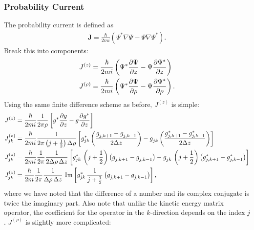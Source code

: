 \documentclass[12pt]{article}
\numberwithin{equation}{section}
\begin{document}
\subsubsection{Probability Current}\label{sec:cylindrical_probability_current}
The probability current is defined as
\begin{align*}
\mathbf{J} = \frac{\hbar}{2m i} \left(\Psi^* \nabla \Psi -\Psi \nabla \Psi^* \right).
\end{align*}
Break this into components:
\begin{align*}
J^{(z)}  &= \frac{\hbar}{2m i} \left(\Psi^* \pdv{\Psi}{z} - \Psi \pdv{\Psi^*}{z} \right) \\
J^{(\rho)}  &= \frac{\hbar}{2m i} \left(\Psi^* \pdv{\Psi}{\rho} - \Psi \pdv{\Psi^*}{\rho} \right).
\end{align*}
Using the same finite difference scheme as before, $J^{(z)}$ is simple:
\begin{align*}
J^{(z)} &= \frac{\hbar}{2m i} \frac{1}{2\pi \rho}\left[g^* \pdv{g}{z} - g \pdv{g^*}{z} \right] \\
%
J^{(z)}_{jk} &= \frac{\hbar}{2m i} \frac{1}{2\pi \left(j+\frac{1}{2}\right) \Delta \rho}\left[g^*_{jk} \left(\frac{g^{}_{j,k+1} - g^{}_{j, k-1}}{2 \Delta z}\right) - g^{}_{jk} \left(\frac{g^{*}_{j,k+1} - g^{*}_{j, k-1}}{2 \Delta z}\right) \right] \\
%
J^{(z)}_{jk} &= \frac{\hbar}{2m i} \frac{1}{2\pi} \frac{1}{2\Delta \rho \, \Delta z}\left[g^*_{jk} \, \left(j+\frac{1}{2}\right) \left(g^{}_{j,k+1} - g^{}_{j, k-1}\right) - g^{}_{jk} \, \left(j+\frac{1}{2}\right)\left(g^{*}_{j,k+1} - g^{*}_{j, k-1}\right) \right] \\
%
J^{(z)}_{jk} &= \frac{\hbar}{2m} \frac{1}{2\pi} \frac{1}{\Delta \rho \, \Delta z} \, \operatorname{Im}\left[g^*_{jk} \, \frac{1}{j + \frac{1}{2}} \left(g^{}_{j,k+1} - g^{}_{j, k-1}\right)\right],
\end{align*}
where we have noted that the difference of a number and its complex conjugate is twice the imaginary part. Also note that unlike the kinetic energy matrix operator, the coefficient for the operator in the $k$-direction depends on the index $j$. $J^{(\rho)}$ is slightly more complicated:
\end{document}
